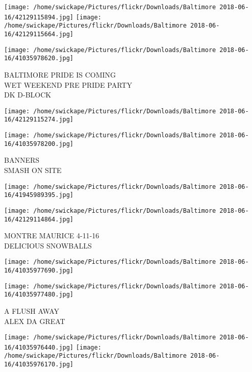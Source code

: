 \documentclass[10pt,letterpaper]{article}
\begin{document}
\texttt{[image: /home/swickape/Pictures/flickr/Downloads/Baltimore 2018-06-16/42129115894.jpg]}
\texttt{[image: /home/swickape/Pictures/flickr/Downloads/Baltimore 2018-06-16/42129115664.jpg]}

\vspace{0.25in}
\texttt{[image: /home/swickape/Pictures/flickr/Downloads/Baltimore 2018-06-16/41035978620.jpg]}

BALTIMORE PRIDE IS COMING\\
WET WEEKEND PRE PRIDE PARTY\\
DK D{-}BLOCK\\
\pagebreak

\texttt{[image: /home/swickape/Pictures/flickr/Downloads/Baltimore 2018-06-16/42129115274.jpg]}

\vspace{0.25in}
\texttt{[image: /home/swickape/Pictures/flickr/Downloads/Baltimore 2018-06-16/41035978200.jpg]}

BANNERS\\
SMASH ON SITE\\
\pagebreak

\texttt{[image: /home/swickape/Pictures/flickr/Downloads/Baltimore 2018-06-16/41945989395.jpg]}

\vspace{0.25in}
\texttt{[image: /home/swickape/Pictures/flickr/Downloads/Baltimore 2018-06-16/42129114864.jpg]}

MONTRE MAURICE 4{-}11{-}16\\
DELICIOUS SNOWBALLS\\
\pagebreak

\texttt{[image: /home/swickape/Pictures/flickr/Downloads/Baltimore 2018-06-16/41035977690.jpg]}

\vspace{0.25in}
\texttt{[image: /home/swickape/Pictures/flickr/Downloads/Baltimore 2018-06-16/41035977480.jpg]}

A FLUSH AWAY\\
ALEX DA GREAT\\
\pagebreak

\texttt{[image: /home/swickape/Pictures/flickr/Downloads/Baltimore 2018-06-16/41035976440.jpg]}
\texttt{[image: /home/swickape/Pictures/flickr/Downloads/Baltimore 2018-06-16/41035976170.jpg]}
\end{document}
